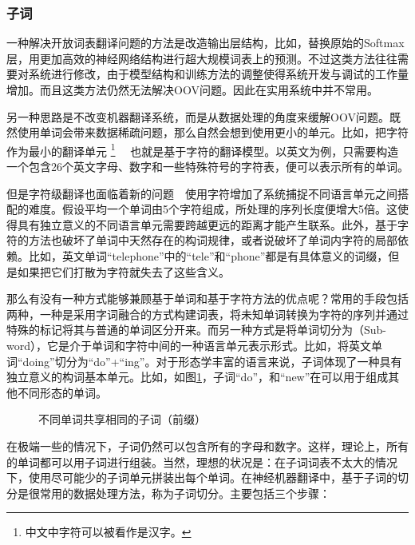 \subsubsection{子词}

\parinterval 一种解决开放词表翻译问题的方法是改造输出层结构\cite{garciamartinez:hal-01433161,DBLP:conf/acl/JeanCMB15}，比如，替换原始的Softmax层，用更加高效的神经网络结构进行超大规模词表上的预测。不过这类方法往往需要对系统进行修改，由于模型结构和训练方法的调整使得系统开发与调试的工作量增加。而且这类方法仍然无法解决OOV问题。因此在实用系统中并不常用。

\parinterval 另一种思路是不改变机器翻译系统，而是从数据处理的角度来缓解OOV问题。既然使用单词会带来数据稀疏问题，那么自然会想到使用更小的单元。比如，把字符作为最小的翻译单元 \footnote{中文中字符可以被看作是汉字。} \ \dash \ 也就是基于字符的翻译模型\cite{DBLP:journals/tacl/LeeCH17}。以英文为例，只需要构造一个包含26个英文字母、数字和一些特殊符号的字符表，便可以表示所有的单词。

\parinterval 但是字符级翻译也面临着新的问题\ \dash\ 使用字符增加了系统捕捉不同语言单元之间搭配的难度。假设平均一个单词由5个字符组成，所处理的序列长度便增大5倍。这使得具有独立意义的不同语言单元需要跨越更远的距离才能产生联系。此外，基于字符的方法也破坏了单词中天然存在的构词规律，或者说破坏了单词内字符的局部依赖。比如，英文单词``telephone''中的``tele''和``phone''都是有具体意义的词缀，但是如果把它们打散为字符就失去了这些含义。

\parinterval 那么有没有一种方式能够兼顾基于单词和基于字符方法的优点呢？常用的手段包括两种，一种是采用字词融合的方式构建词表，将未知单词转换为字符的序列并通过特殊的标记将其与普通的单词区分开来\cite{luong2016acl_hybrid}。而另一种方式是将单词切分为{\small{}}（Sub-word），它是介于单词和字符中间的一种语言单元表示形式。比如，将英文单词``doing''切分为``do''+``ing''。对于形态学丰富的语言来说，子词体现了一种具有独立意义的构词基本单元。比如，如图\ref{fig:7-8}，子词``do''，和``new''在可以用于组成其他不同形态的单词。

\begin{figure}[htp]
\centering

\caption{不同单词共享相同的子词（前缀）}
\label{fig:7-8}
\end{figure}

\parinterval 在极端一些的情况下，子词仍然可以包含所有的字母和数字。这样，理论上，所有的单词都可以用子词进行组装。当然，理想的状况是：在子词词表不太大的情况下，使用尽可能少的子词单元拼装出每个单词。在神经机器翻译中，基于子词的切分是很常用的数据处理方法，称为子词切分。主要包括三个步骤：

